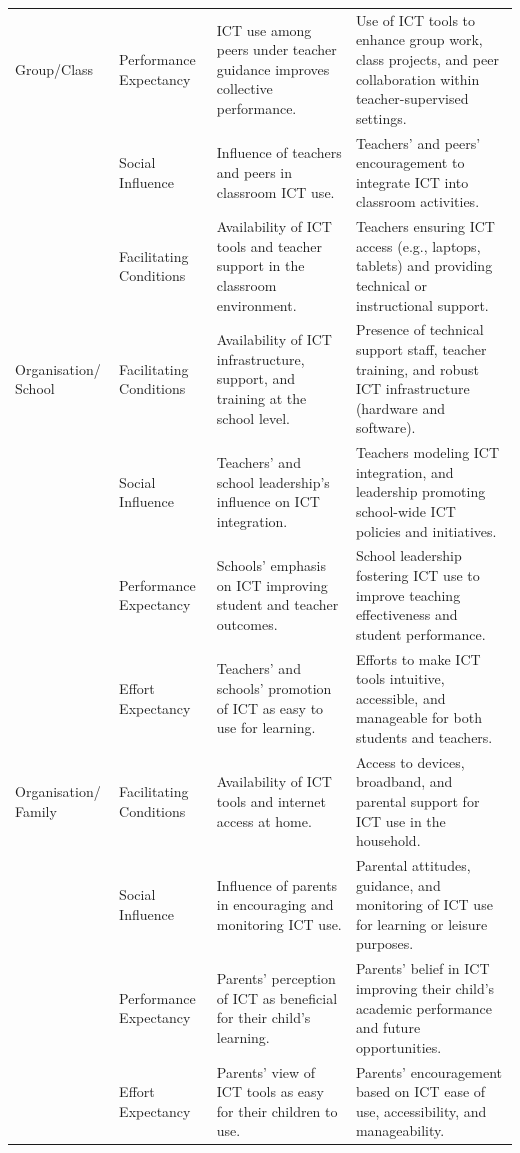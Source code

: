 \documentclass[
]{article}
\begin{document}
\begin{longtable}[t]{>{\raggedright\arraybackslash}p{2cm}>{\raggedright\arraybackslash}p{3cm}>{\raggedright\arraybackslash}p{5cm}>{\raggedright\arraybackslash}p{5cm}}
Group/Class & Performance Expectancy & ICT use among peers under teacher guidance improves collective performance. & Use of ICT tools to enhance group work, class projects, and peer collaboration within teacher-supervised settings.\\
 & Social Influence & Influence of teachers and peers in classroom ICT use. & Teachers' and peers’ encouragement to integrate ICT into classroom activities.\\
 & Facilitating Conditions & Availability of ICT tools and teacher support in the classroom environment. & Teachers ensuring ICT access (e.g., laptops, tablets) and providing technical or instructional support.\\
\addlinespace
Organisation/ School & Facilitating Conditions & Availability of ICT infrastructure, support, and training at the school level. & Presence of technical support staff, teacher training, and robust ICT infrastructure (hardware and software).\\
 & Social Influence & Teachers' and school leadership’s influence on ICT integration. & Teachers modeling ICT integration, and leadership promoting school-wide ICT policies and initiatives.\\
 & Performance Expectancy & Schools’ emphasis on ICT improving student and teacher outcomes. & School leadership fostering ICT use to improve teaching effectiveness and student performance.\\
 & Effort Expectancy & Teachers' and schools' promotion of ICT as easy to use for learning. & Efforts to make ICT tools intuitive, accessible, and manageable for both students and teachers.\\
Organisation/ Family & Facilitating Conditions & Availability of ICT tools and internet access at home. & Access to devices, broadband, and parental support for ICT use in the household.\\
\addlinespace
 & Social Influence & Influence of parents in encouraging and monitoring ICT use. & Parental attitudes, guidance, and monitoring of ICT use for learning or leisure purposes.\\
 & Performance Expectancy & Parents' perception of ICT as beneficial for their child’s learning. & Parents' belief in ICT improving their child’s academic performance and future opportunities.\\
 & Effort Expectancy & Parents’ view of ICT tools as easy for their children to use. & Parents' encouragement based on ICT ease of use, accessibility, and manageability.\\

\end{longtable}
\end{document}
